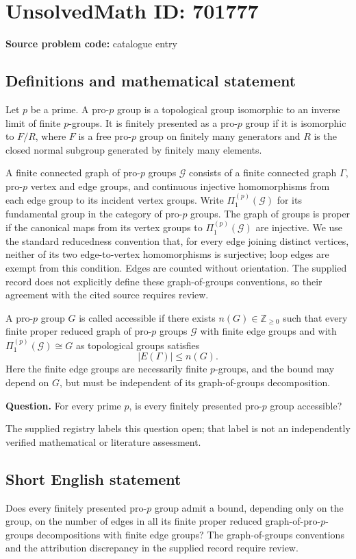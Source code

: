 \documentclass[11pt]{article}
\newcommand{\Z}{\mathbb{Z}}
\begin{document}
\section*{UnsolvedMath ID: 701777}
\textbf{Source problem code:} catalogue entry
\subsection{Definitions and mathematical statement}
Let \(p\) be a prime. A pro-\(p\) group is a topological group isomorphic to an inverse limit of finite \(p\)-groups. It is finitely presented as a pro-\(p\) group if it is isomorphic to \(F/R\), where \(F\) is a free pro-\(p\) group on finitely many generators and \(R\) is the closed normal subgroup generated by finitely many elements.

A finite connected graph of pro-\(p\) groups \(\mathcal G\) consists of a finite connected graph \(\Gamma\), pro-\(p\) vertex and edge groups, and continuous injective homomorphisms from each edge group to its incident vertex groups. Write \(\Pi_1^{(p)}(\mathcal G)\) for its fundamental group in the category of pro-\(p\) groups. The graph of groups is proper if the canonical maps from its vertex groups to \(\Pi_1^{(p)}(\mathcal G)\) are injective. We use the standard reducedness convention that, for every edge joining distinct vertices, neither of its two edge-to-vertex homomorphisms is surjective; loop edges are exempt from this condition. Edges are counted without orientation. The supplied record does not explicitly define these graph-of-groups conventions, so their agreement with the cited source requires review.

A pro-\(p\) group \(G\) is called accessible if there exists \(n(G)\in\Z_{\geq 0}\) such that every finite proper reduced graph of pro-\(p\) groups \(\mathcal G\) with finite edge groups and with \(\Pi_1^{(p)}(\mathcal G)\cong G\) as topological groups satisfies
\[
\lvert E(\Gamma)\rvert\leq n(G).
\]
Here the finite edge groups are necessarily finite \(p\)-groups, and the bound may depend on \(G\), but must be independent of its graph-of-groups decomposition.

\textbf{Question.} For every prime \(p\), is every finitely presented pro-\(p\) group accessible?

The supplied registry labels this question open; that label is not an independently verified mathematical or literature assessment.
\subsection{Short English statement}
Does every finitely presented pro-\(p\) group admit a bound, depending only on the group, on the number of edges in all its finite proper reduced graph-of-pro-\(p\)-groups decompositions with finite edge groups? The graph-of-groups conventions and the attribution discrepancy in the supplied record require review.
\end{document}
